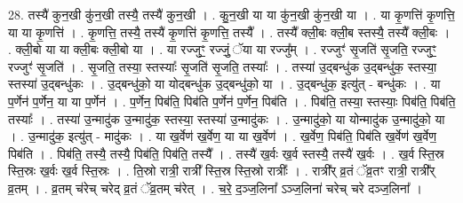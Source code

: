 \documentclass[17pt]{extarticle}
\begin{document}
28. तस्यै॑ कुन॒खी कु॑न॒खी तस्यै॒ तस्यै॑ कुन॒खी । . कु॒न॒खी या या कु॑न॒खी कु॑न॒खी या । . या कृ॒णत्ति॑ कृ॒णत्ति॒ या या कृ॒णत्ति॑ । . कृ॒णत्ति॒ तस्यै॒ तस्यै॑ कृ॒णत्ति॑ कृ॒णत्ति॒ तस्यै᳚ । . तस्यै᳚ क्ली॒बः क्ली॒ब स्तस्यै॒ तस्यै᳚ क्ली॒बः । . क्ली॒बो या या क्ली॒बः क्ली॒बो या । . या रज्जुꣳ॒॒ रज्जुं॒ ॅया या रज्जु᳚म् । . रज्जुꣳ॑ सृ॒जति॑ सृ॒जति॒ रज्जुꣳ॒॒ रज्जुꣳ॑ सृ॒जति॑ । . सृ॒जति॒ तस्या॒ स्तस्याः᳚ सृ॒जति॑ सृ॒जति॒ तस्याः᳚ । . तस्या॑ उ॒द्बन्धु॑क उ॒द्बन्धु॑क॒ स्तस्या॒ स्तस्या॑ उ॒द्बन्धु॑कः । . उ॒द्बन्धु॑को॒ या योद्बन्धु॑क उ॒द्बन्धु॑को॒ या । . उ॒द्बन्धु॑क॒ इत्यु॑त् - बन्धु॑कः । . या प॒र्णेन॑ प॒र्णेन॒ या या प॒र्णेन॑ । . प॒र्णेन॒ पिब॑ति॒ पिब॑ति प॒र्णेन॑ प॒र्णेन॒ पिब॑ति । . पिब॑ति॒ तस्या॒ स्तस्याः॒ पिब॑ति॒ पिब॑ति॒ तस्याः᳚ । . तस्या॑ उ॒न्मादु॑क उ॒न्मादु॑क॒ स्तस्या॒ स्तस्या॑ उ॒न्मादु॑कः । . उ॒न्मादु॑को॒ या योन्मादु॑क उ॒न्मादु॑को॒ या । . उ॒न्मादु॑क॒ इत्यु॑त् - मादु॑कः । . या ख॒र्वेण॑ ख॒र्वेण॒ या या ख॒र्वेण॑ । . ख॒र्वेण॒ पिब॑ति॒ पिब॑ति ख॒र्वेण॑ ख॒र्वेण॒ पिब॑ति । . पिब॑ति॒ तस्यै॒ तस्यै॒ पिब॑ति॒ पिब॑ति॒ तस्यै᳚ । . तस्यै॑ ख॒र्वः ख॒र्व स्तस्यै॒ तस्यै॑ ख॒र्वः । . ख॒र्व स्ति॒स्र स्ति॒स्रः ख॒र्वः ख॒र्व स्ति॒स्रः । . ति॒स्रो रात्री॒ रात्री᳚ स्ति॒स्र स्ति॒स्रो रात्रीः᳚ । . रात्री᳚र् व्र॒तं ॅव्र॒तꣳ रात्री॒ रात्री᳚र् व्र॒तम् । . व्र॒तम् च॑रेच् चरेद् व्र॒तं ॅव्र॒तम् च॑रेत् । . च॒रे॒ द॒ञ्ज॒लिना᳚ ऽञ्ज॒लिना॑ चरेच् चरे दञ्ज॒लिना᳚ । \newline
\end{document}
